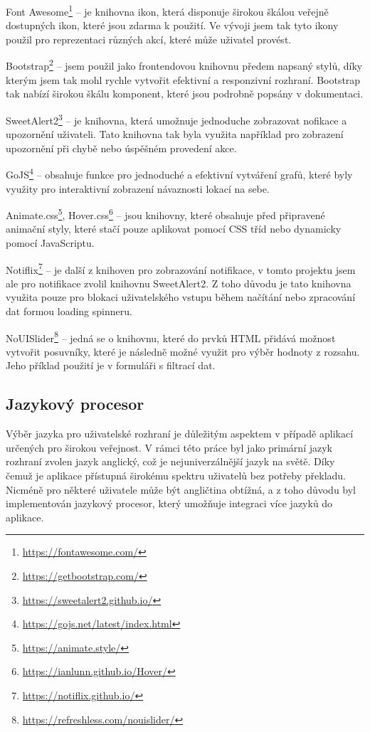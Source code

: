 \begin{description}
    \item Font Awesome\footnote{\href{https://fontawesome.com/}{https://fontawesome.com/}} -- je knihovna ikon, která disponuje širokou škálou veřejně dostupných ikon, které jsou zdarma k použití. Ve vývoji jsem tak tyto ikony použil pro reprezentaci různých akcí, které může uživatel provést.
    \item Bootstrap\footnote{\href{https://getbootstrap.com/}{https://getbootstrap.com/}} -- jsem použil jako frontendovou knihovnu předem napsaný stylů, díky kterým jsem tak mohl rychle vytvořit efektivní a responzivní rozhraní. Bootstrap tak nabízí širokou škálu komponent, které jsou podrobně popsány v dokumentaci.
    \item SweetAlert2\footnote{\href{https://sweetalert2.github.io/}{https://sweetalert2.github.io/}} -- je knihovna, která umožnuje jednoduche zobrazovat nofikace a upozornění uživateli. Tato knihovna tak byla využita například pro zobrazení upozornění při chybě nebo úspěšném provedení akce.
    \item GoJS\footnote{\href{https://gojs.net/latest/index.html}{https://gojs.net/latest/index.html}} -- obsahuje funkce pro jednoduché a efektivní vytváření grafů, které byly využity pro interaktivní zobrazení návaznosti lokací na sebe.
    \item Animate.css\footnote{\href{https://animate.style/}{https://animate.style/}}, Hover.css\footnote{\href{https://ianlunn.github.io/Hover/}{https://ianlunn.github.io/Hover/}} -- jsou knihovny, které obsahuje před připravené animační styly, které stačí pouze aplikovat pomocí CSS tříd nebo dynamicky pomocí JavaScriptu.
    \item Notiflix\footnote{\href{https://notiflix.github.io/}{https://notiflix.github.io/}} -- je další z knihoven pro zobrazování notifikace, v tomto projektu jsem ale pro notifikace zvolil knihovnu SweetAlert2. Z toho důvodu je tato knihovna využita pouze pro blokaci uživatelského vstupu během načítání nebo zpracování dat formou loading spinneru.
    \item NoUISlider\footnote{\href{https://refreshless.com/nouislider/}{https://refreshless.com/nouislider/}} -- jedná se o knihovnu, které do prvků HTML přidává možnost vytvořit posuvníky, které je následně možné využit pro výběr hodnoty z rozsahu. Jeho příklad použití je v formuláři s filtrací dat.
\end{description}

\subsection{Jazykový procesor}
\label{subsec:implementation-technologies-compiler}
Výběr jazyka pro uživatelské rozhraní je důležitým aspektem v případě aplikací určených pro širokou veřejnost. V rámci této práce byl jako primární jazyk rozhraní zvolen jazyk anglický, což je nejuniverzálnější jazyk na světě. Díky čemuž je aplikace přístupná širokému spektru uživatelů bez potřeby překladu. Nicméně pro některé uživatele může být angličtina obtížná, a z toho důvodu byl implementován jazykový procesor, který umožňuje integraci více jazyků do aplikace.

